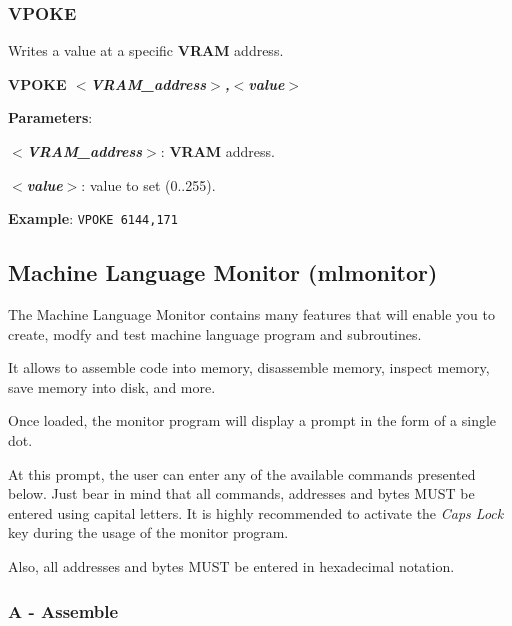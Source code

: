         \subsubsection{{VPOKE}}
        Writes a value at a specific \textbf{VRAM} address.

        \hspace{1.9cm}\textbf{VPOKE \textit{$<$VRAM\_address$>$,$<$value$>$}}

        \textbf{Parameters}:

        \hspace{1cm}\textbf{\textit{$<$VRAM\_address$>$}}: \textbf{VRAM} address.

        \hspace{1cm}\textbf{\textit{$<$value$>$}}: value to set (0..255).

        \textbf{Example}: \texttt{VPOKE 6144,171}

    \subsection{Machine Language Monitor (mlmonitor)}
    \label{software:mlmonitor}

    The Machine Language Monitor contains many features that will enable you to
    create, modfy and test machine language program and subroutines.

    It allows to assemble code into memory, disassemble memory, inspect memory,
    save memory into disk, and more.

    Once loaded, the monitor program will display a prompt in the form of a
    single dot.

    At this prompt, the user can enter any of the available commands presented
    below. Just bear in mind that all commands, addresses and bytes MUST be
    entered using capital letters. It is highly recommended to activate the
    \textit{Caps Lock} key during the usage of the monitor program.

    Also, all addresses and bytes MUST be entered in hexadecimal notation.

        \subsubsection{A - Assemble}

